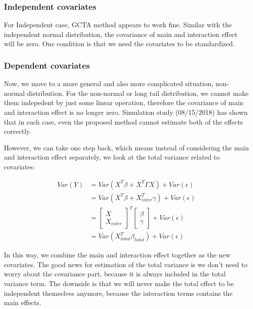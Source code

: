 \documentclass[]{article}
\begin{document}
\subsubsection{Independent covariates}\label{independent-covariates-1}

For Independent case, GCTA method appears to work fine. Similar with the
independent normal distribution, the covariance of main and interaction
effect will be zero. One condition is that we need the covariates to be
standardized.

\subsubsection{Dependent covariates}\label{dependent-covariates-1}

Now, we move to a more general and also more complicated situation,
non-normal distribution. For the non-normal or long tail distribution,
we cannot make them indepedent by just some linear operation, therefore
the covariance of main and interaction effect is no longer zero.
Simulation study (08/15/2018) has shown that in such case, even the
proposed method cannot estimate both of the effects correctly.

However, we can take one step back, which means instead of considering
the main and interaction effect separately, we look at the total
variance related to covariates:

\begin{align*}
  Var(Y) &= Var(X^T\beta + X^T \Gamma X) + Var(\epsilon) \\
           &= Var(X^T\beta + X_{inter}^T \gamma) + Var(\epsilon) \\
           &= \begin{bmatrix}   
                  X \\        
                  X_{inter}   
              \end{bmatrix}^T     
              \begin{bmatrix}
                \beta \\
                \gamma
              \end{bmatrix} + Var(\epsilon) \\
           &= Var(X_{total}^T \beta_{total}) + Var(\epsilon)
\end{align*}

In this way, we combine the main and interaction effect together as the
new covariates. The good news for estimation of the total variance is we
don't need to worry about the covariance part, because it is always
included in the total variance term. The downside is that we will never
make the total effect to be independent themselves anymore, because the
interaction terms contains the main effects.
\end{document}
